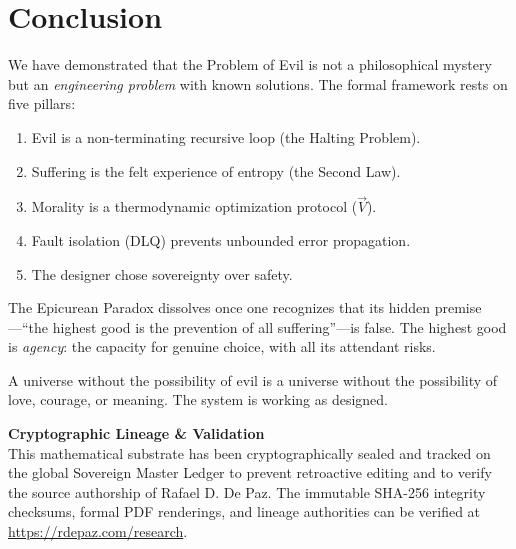 \documentclass[12pt, a4paper]{article}
\theoremstyle{plain}
\theoremstyle{definition}
\theoremstyle{remark}
\begin{document}
\section{Conclusion}\label{sec:conclusion}

We have demonstrated that the Problem of Evil is not a philosophical
mystery but an \emph{engineering problem} with known solutions. The formal
framework rests on five pillars:

\begin{enumerate}
  \item Evil is a non-terminating recursive loop (the Halting Problem).
  \item Suffering is the felt experience of entropy (the Second Law).
  \item Morality is a thermodynamic optimization protocol ($\vec{V}$).
  \item Fault isolation (DLQ) prevents unbounded error propagation.
  \item The designer chose sovereignty over safety.
\end{enumerate}

The Epicurean Paradox dissolves once one recognizes that its hidden
premise---``the highest good is the prevention of all suffering''---is
false. The highest good is \emph{agency}: the capacity for genuine choice,
with all its attendant risks.

A universe without the possibility of evil is a universe without the
possibility of love, courage, or meaning. The system is working as designed.


\vspace{2em}
\noindent\hrulefill
\vspace{1em}

\noindent\textbf{Cryptographic Lineage \& Validation}\\
This mathematical substrate has been cryptographically sealed and tracked on the global Sovereign Master Ledger to prevent retroactive editing and to verify the source authorship of Rafael D. De Paz. The immutable SHA-256 integrity checksums, formal PDF renderings, and lineage authorities can be verified at \url{https://rdepaz.com/research}.



\end{document}

